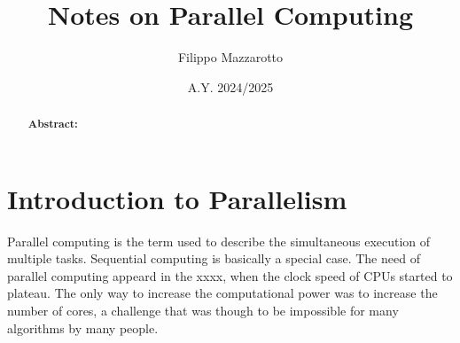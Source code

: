 \documentclass[a4paper]{tufte-handout} %
\title{Notes on Parallel Computing}
\author{Filippo Mazzarotto}
\date{A.Y. 2024/2025} %
\begin{document}
\maketitle %


\begin{abstract}
	\textbf{Abstract:} 
\end{abstract}







%
%
%
%

\section{Introduction to Parallelism}

Parallel computing is the term used to describe the simultaneous execution of multiple tasks. Sequential computing is basically a special case. The need of parallel computing appeard in the xxxx, when the clock speed of CPUs started to plateau. The only way to increase the computational power was to increase the number of cores, a challenge that was though to be impossible for many algorithms by many people.
\end{document}
